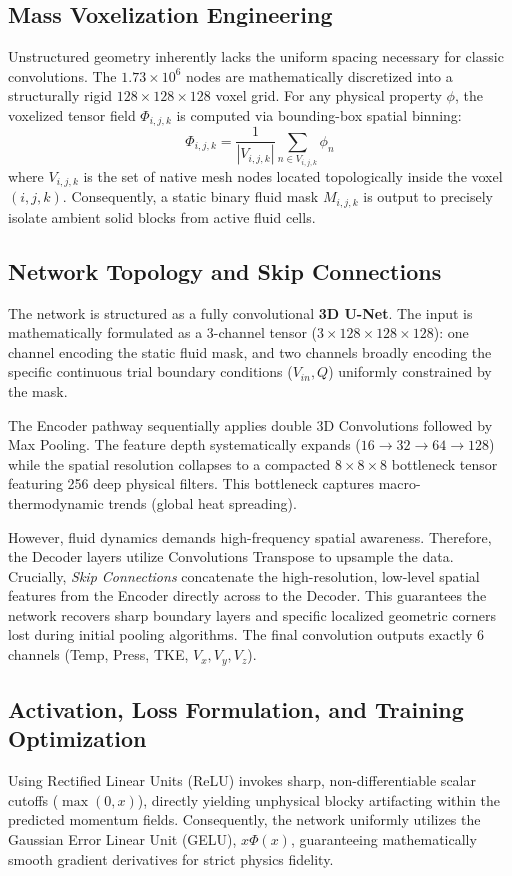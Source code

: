\documentclass[conference]{IEEEtran}
\begin{document}
\subsection{Mass Voxelization Engineering}
Unstructured geometry inherently lacks the uniform spacing necessary for classic convolutions. The $1.73\times10^6$ nodes are mathematically discretized into a structurally rigid $128 \times 128 \times 128$ voxel grid. For any physical property $\phi$, the voxelized tensor field $\Phi_{i,j,k}$ is computed via bounding-box spatial binning:
\begin{equation}
    \Phi_{i,j,k} = \frac{1}{|V_{i,j,k}|} \sum_{n \in V_{i,j,k}} \phi_n
\end{equation}
where $V_{i,j,k}$ is the set of native mesh nodes located topologically inside the voxel $(i, j, k)$. Consequently, a static binary fluid mask $M_{i,j,k}$ is output to precisely isolate ambient solid blocks from active fluid cells.

\subsection{Network Topology and Skip Connections}
The network is structured as a fully convolutional \textbf{3D U-Net}. The input is mathematically formulated as a 3-channel tensor ($3 \times 128 \times 128 \times 128$): one channel encoding the static fluid mask, and two channels broadly encoding the specific continuous trial boundary conditions ($V_{in}, Q$) uniformly constrained by the mask. 

The Encoder pathway sequentially applies double 3D Convolutions followed by Max Pooling. The feature depth systematically expands ($16 \rightarrow 32 \rightarrow 64 \rightarrow 128$) while the spatial resolution collapses to a compacted $8 \times 8 \times 8$ bottleneck tensor featuring 256 deep physical filters. This bottleneck captures macro-thermodynamic trends (global heat spreading).

However, fluid dynamics demands high-frequency spatial awareness. Therefore, the Decoder layers utilize Convolutions Transpose to upsample the data. Crucially, \textit{Skip Connections} concatenate the high-resolution, low-level spatial features from the Encoder directly across to the Decoder. This guarantees the network recovers sharp boundary layers and specific localized geometric corners lost during initial pooling algorithms. The final convolution outputs exactly 6 channels (Temp, Press, TKE, $V_x, V_y, V_z$).

\subsection{Activation, Loss Formulation, and Training Optimization}
Using Rectified Linear Units (ReLU) invokes sharp, non-differentiable scalar cutoffs ($\max(0, x)$), directly yielding unphysical blocky artifacting within the predicted momentum fields. Consequently, the network uniformly utilizes the Gaussian Error Linear Unit (GELU), $x \Phi(x)$, guaranteeing mathematically smooth gradient derivatives for strict physics fidelity.
\end{document}
